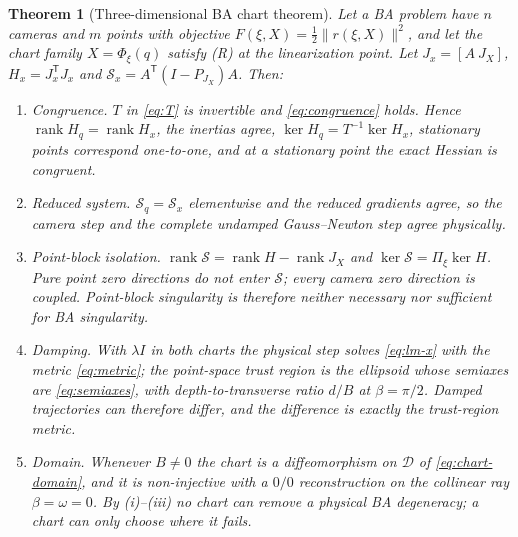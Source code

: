 \documentclass[11pt,a4paper]{article}
\newtheorem{theorem}{Theorem}
\theoremstyle{definition}
\theoremstyle{remark}
\DeclareMathOperator{\rank}{rank}
\newcommand{\T}{\mathsf{T}}
\begin{document}
\begin{theorem}[Three-dimensional BA chart theorem]\label{thm:main}
Let a BA problem have $n$ cameras and $m$ points with objective $F(\xi,X)=\tfrac12\|r(\xi,X)\|^{2}$, and let the chart family $X=\Phi_\xi(q)$ satisfy (R) at the linearization point. Let $J_x=[A\ J_X]$, $H_x=J_x^{\T}J_x$ and $\mathcal S_x=A^{\T}(I-P_{J_X})A$. Then:
\begin{enumerate}[label=(\roman*),leftmargin=2.4em]
  \item \emph{Congruence.} $T$ in \eqref{eq:T} is invertible and \eqref{eq:congruence} holds. Hence $\rank H_q=\rank H_x$, the inertias agree, $\ker H_q=T^{-1}\ker H_x$, stationary points correspond one-to-one, and at a stationary point the exact Hessian is congruent.
  \item \emph{Reduced system.} $\mathcal S_q=\mathcal S_x$ elementwise and the reduced gradients agree, so the camera step and the complete undamped Gauss--Newton step agree physically.
  \item \emph{Point-block isolation.} $\rank\mathcal S=\rank H-\rank J_X$ and $\ker\mathcal S=\Pi_\xi\ker H$. Pure point zero directions do not enter $\mathcal S$; every camera zero direction is coupled. Point-block singularity is therefore neither necessary nor sufficient for BA singularity.
  \item \emph{Damping.} With $\lambda I$ in both charts the physical step solves \eqref{eq:lm-x} with the metric \eqref{eq:metric}; the point-space trust region is the ellipsoid whose semiaxes are \eqref{eq:semiaxes}, with depth-to-transverse ratio $d/B$ at $\beta=\pi/2$. Damped trajectories can therefore differ, and the difference is exactly the trust-region metric.
  \item \emph{Domain.} Whenever $B\neq0$ the chart is a diffeomorphism on $\mathcal D$ of \eqref{eq:chart-domain}, and it is non-injective with a $0/0$ reconstruction on the collinear ray $\beta=\omega=0$. By (i)--(iii) no chart can remove a physical BA degeneracy; a chart can only choose where it fails.
\end{enumerate}
\end{theorem}
\end{document}
